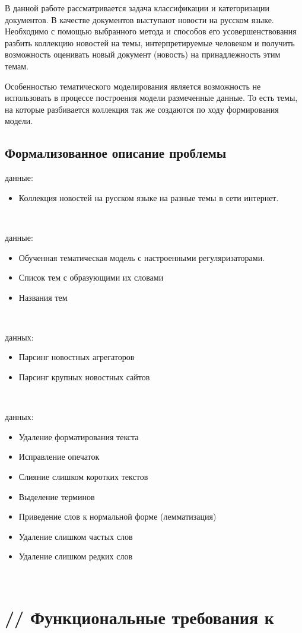 В данной работе рассматривается задача \todo{}классификации и категоризации документов. В качестве документов выступают новости на русском языке. Необходимо с помощью выбранного метода и способов его усовершенствования разбить коллекцию новостей на темы, интерпретируемые человеком и получить возможность оценивать новый документ (новость) на принадлежность этим темам.

Особенностью тематического моделирования является возможность не использовать в процессе построения модели размеченные данные. То есть темы, на которые разбивается коллекция так же создаются по ходу формирования модели. 

\subsection{Формализованное описание проблемы}

 данные:

\begin{itemize}
    \item Коллекция новостей на русском языке на разные темы в сети интернет.
\end{itemize}

~\

 данные:

\begin{itemize}
    \item Обученная тематическая модель с настроенными регуляризаторами.
    \item Список тем с образующими их словами
    \item \todo{}Названия тем
\end{itemize}

~\

 данных:

\begin{itemize}
    \item Парсинг новостных агрегаторов
    \item Парсинг крупных новостных сайтов
\end{itemize}

~\

 данных:

\begin{itemize}
    \item Удаление форматирования текста
    \item Исправление опечаток
    \item Слияние слишком коротких текстов
    \item Выделение терминов
    \item Приведение слов к нормальной форме (лемматизация)
    \item Удаление слишком частых слов
    \item Удаление слишком редких слов
\end{itemize}

~\



%
\section{// Функциональные требования к }
